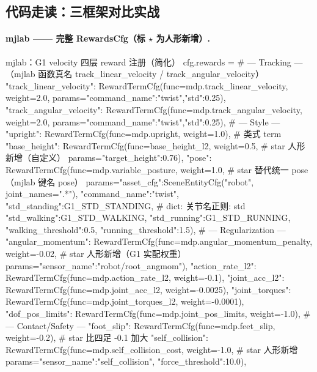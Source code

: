 \subsection{代码走读：三框架对比实战}

\paragraph{mjlab —— 完整 RewardsCfg（标 $\star$ 为人形新增）.}

\begin{codebox}[Python]{mjlab：G1 velocity 四层 reward 注册（简化）}
cfg.rewards = {
    # --- Tracking ---（mjlab 函数真名 track_linear_velocity / track_angular_velocity）
    "track_linear_velocity":  RewardTermCfg(func=mdp.track_linear_velocity, weight=2.0,
                                            params={"command_name":"twist","std":0.25}),
    "track_angular_velocity": RewardTermCfg(func=mdp.track_angular_velocity, weight=2.0,
                                            params={"command_name":"twist","std":0.25}),
    # --- Style ---
    "upright":          RewardTermCfg(func=mdp.upright, weight=1.0),            # 类式 term
    "base_height":      RewardTermCfg(func=base_height_l2, weight=0.5,          # star 人形新增（自定义）
                                      params={"target_height":0.76}),
    "pose":             RewardTermCfg(func=mdp.variable_posture, weight=1.0,    # star 替代统一 pose（mjlab 键名 pose）
                                      params={"asset_cfg":SceneEntityCfg("robot", joint_names=".*"),
                                              "command_name":"twist",
                                              "std_standing":G1_STD_STANDING,   # dict: {关节名正则: std}
                                              "std_walking":G1_STD_WALKING,
                                              "std_running":G1_STD_RUNNING,
                                              "walking_threshold":0.5, "running_threshold":1.5}),
    # --- Regularization ---
    "angular_momentum": RewardTermCfg(func=mdp.angular_momentum_penalty, weight=-0.02,  # star 人形新增（G1 实配权重）
                                      params={"sensor_name":"robot/root_angmom"}),
    "action_rate_l2":   RewardTermCfg(func=mdp.action_rate_l2, weight=-0.1),
    "joint_acc_l2":     RewardTermCfg(func=mdp.joint_acc_l2,   weight=-0.0025),
    "joint_torques":    RewardTermCfg(func=mdp.joint_torques_l2, weight=-0.0001),
    "dof_pos_limits":   RewardTermCfg(func=mdp.joint_pos_limits, weight=-1.0),
    # --- Contact/Safety ---
    "foot_slip":        RewardTermCfg(func=mdp.feet_slip, weight=-0.2),         # star 比四足 -0.1 加大
    "self_collision":   RewardTermCfg(func=mdp.self_collision_cost, weight=-1.0,  # star 人形新增
                                      params={"sensor_name":"self_collision",
                                              "force_threshold":10.0}),
}
\end{codebox}


